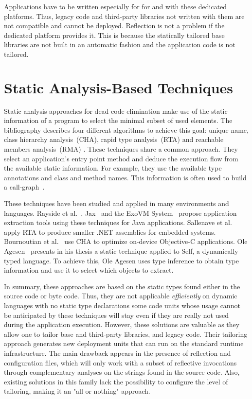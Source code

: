 Applications have to be written especially for for and with these dedicated platforms. Thus, legacy code and third-party libraries not written with them are not compatible and cannot be deployed. Reflection is not a problem if the dedicated platform provides it. This is because the statically tailored base libraries are not built in an automatic fashion and the application code is not tailored.

\section{Static Analysis-Based Techniques}\label{section:static_rw}

Static analysis approaches for dead code elimination make use of the static information of a program to select the minimal subset of used elements. The bibliography describes four different algorithms to achieve this goal: unique name, class hierarchy analysis~(CHA), rapid type analysis~(RTA) and reachable members analysis~(RMA) \cite{Baco96a, Titz06a}. These techniques share a common approach. They select an application's entry point method and deduce the execution flow from the available static information. For example, they use the available type annotations and class and method names. This information is often used to build a call-graph~\cite{Grov97a}.

These techniques have been studied and applied in many environments and languages. Rayside et al.~\cite{Rays02a}, Jax~\cite{Tip03a} and the ExoVM System~\cite{Titz06a} propose application extraction tools using these techniques for Java applications. Sallenave et al.~\cite{Sall10a} apply RTA to produce smaller .NET assemblies for embedded systems. Bournoutian et al.~\cite{Bour14a} use CHA to optimize on-device Objective-C applications. Ole Agesen~\cite{Ages96a} presents in his thesis a static technique applied to Self, a dynamically-typed language. To achieve this, Ole Agesen uses type inference to obtain type information and use it to select which objects to extract.

In summary, these approaches are based on the static types found either in the source code or byte code. Thus, they are not applicable \emph{efficiently} on dynamic languages with no static type declarations \ie some code units whose usage cannot be anticipated by these techniques will stay even if they are really not used during the application execution. However, these solutions are valuable as they allow one to tailor base and third-party libraries, and legacy code. Their tailoring approach generates new deployment units that can run on the standard runtime infrastructure. The main drawback appears in the presence of reflection and configuration files, which will only work with a subset of reflective invocations through complementary analyses on the strings found in the source code. Also, existing solutions in this family lack the possibility to configure the level of tailoring, making it an "all or nothing" approach.

